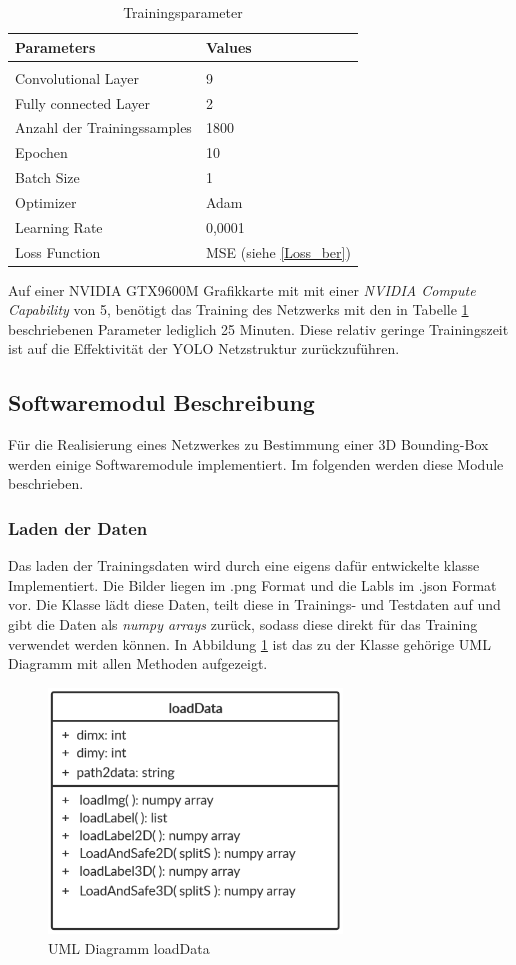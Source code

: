 \begin{table}[!htb]

\centering
\caption{Trainingsparameter}
\begin{tabular}{ll}
\label{trainings_param}
\textbf{Parameters}                  & \textbf{Values} \\ \hline
\\Convolutional Layer        & 9      \\
Fully connected Layer       & 2      \\
Anzahl der Trainingssamples & 1800    \\
Epochen                  & 10     \\
Batch Size                  & 1     \\
Optimizer                   & Adam   \\
Learning Rate               & 0,0001 \\
Loss Function               & MSE (siehe \ref{Loss_ber})   
\end{tabular}
\end{table}
Auf einer NVIDIA GTX9600M Grafikkarte mit mit einer \textit{NVIDIA Compute Capability} von 5, benötigt das Training des Netzwerks mit den in Tabelle \ref{trainings_param} beschriebenen Parameter lediglich 25 Minuten. Diese relativ geringe Trainingszeit ist auf die Effektivität der YOLO Netzstruktur zurückzuführen.   
\subsection{Softwaremodul Beschreibung}
Für die Realisierung eines Netzwerkes zu Bestimmung einer 3D Bounding-Box werden einige Softwaremodule implementiert. Im folgenden werden diese Module beschrieben. 
\subsubsection{Laden der Daten}
Das laden der Trainingsdaten wird durch eine eigens dafür entwickelte klasse Implementiert. Die Bilder liegen im .png Format und die Labls im .json Format vor. Die Klasse lädt diese Daten, teilt diese in Trainings- und Testdaten auf und gibt die Daten als \textit{numpy arrays} zurück, sodass diese direkt für das Training verwendet werden können. In Abbildung \ref{UML_load} ist das zu der Klasse gehörige UML Diagramm mit allen Methoden aufgezeigt.
\begin{figure}[!htb]
  \centering
  \includegraphics[width=7.8cm]{Abb/ULM_class_loadData.PNG}
  \caption{UML Diagramm loadData}
  \label{UML_load}
\end{figure} 
